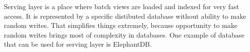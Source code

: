 
Serving layer is a place where batch views are loaded and indexed for very fast
access.
It is represented by a specific distibuted database without ability to make random writes.
That simplifies things extremely, because opportunity to make random writes
brings most of complexity in databases.
One example of database that can be used for serving layer is ElephantDB.


